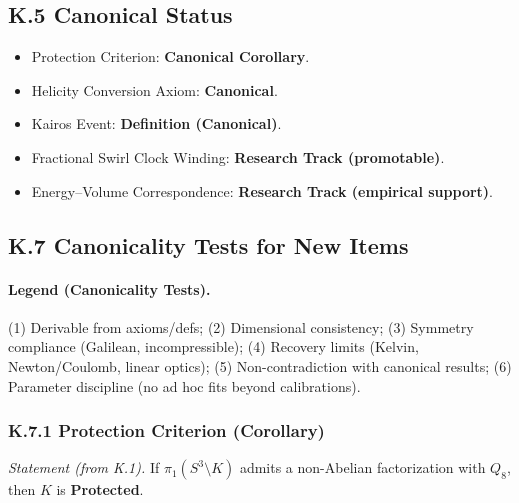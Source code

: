 \documentclass[10pt,reprint,aps,onecolumn,nofootinbib]{revtex4-2}
\begin{document}
    \subsection*{K.5 Canonical Status}

    \begin{itemize}
        \item Protection Criterion: \textbf{Canonical Corollary}.
        \item Helicity Conversion Axiom: \textbf{Canonical}.
        \item Kairos Event: \textbf{Definition (Canonical)}.
        \item Fractional Swirl Clock Winding: \textbf{Research Track (promotable)}.
        \item Energy–Volume Correspondence: \textbf{Research Track (empirical support)}.
    \end{itemize}

    \subsection*{K.7 Canonicality Tests for New Items}
    \label{app:knot_protection:tests}

    \paragraph{Legend (Canonicality Tests).}
    (1) Derivable from axioms/defs; (2) Dimensional consistency; (3) Symmetry compliance (Galilean, incompressible);
        (4) Recovery limits (Kelvin, Newton/Coulomb, linear optics); (5) Non-contradiction with canonical results;
        (6) Parameter discipline (no ad hoc fits beyond calibrations).

    \subsubsection*{K.7.1 Protection Criterion (Corollary)}
    \emph{Statement (from K.1).} If $\pi_1(S^3\!\setminus\!K)$ admits a non-Abelian factorization with $Q_8$, then $K$ is \textbf{Protected}.
\end{document}
